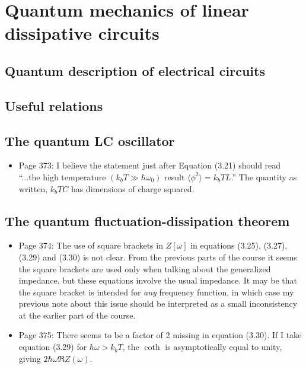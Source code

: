\section{Quantum mechanics of linear dissipative circuits}

\subsection{Quantum description of electrical circuits}

\subsection{Useful relations}

\subsection{The quantum LC oscillator}

\begin{itemize}

\item Page 373: I believe the statement just after Equation (3.21) should read ``...the high temperature $(k_bT \gg \hbar \omega_0)$ result $\langle \phi^2 \rangle=k_b T L$.''
The quantity as written, $k_b T C$ has dimensions of charge squared.

\end{itemize}

\subsection{The quantum fluctuation-dissipation theorem}

\begin{itemize}

\item Page 374: The use of square brackets in $Z[\omega]$ in equations (3.25), (3.27), (3.29) and (3.30) is not clear. From the previous parts of the course it seems the square brackets are used only when talking about the generalized impedance, but these equations involve the usual impedance. It may be that the square bracket is intended for \emph{any} frequency function, in which case my previous note about this issue should be interpreted as a small inconsistency at the earlier part of the course.

\item Page 375: There seems to be a factor of 2 missing in equation (3.30). If I take equation (3.29) for $\hbar \omega > k_b T$, the $\coth$ is asymptotically equal to unity, giving $2 \hbar \omega \Re Z(\omega)$.

\end{itemize}

